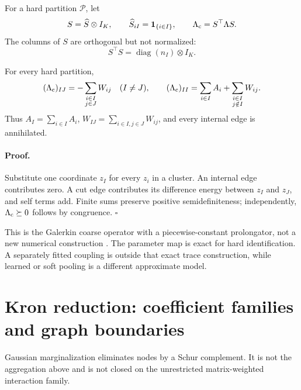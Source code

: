 For a hard partition \(\mathcal P\), let
\[
S=\widehat S\otimes I_K,\qquad
\widehat S_{iI}=\mathbf1_{\{i\in I\}},\qquad
\Lambda_{\rm c}=S^\top\Lambda S.
\]
The columns of \(S\) are orthogonal but not normalized:
\begin{equation}
S^\top S=\operatorname{diag}(n_I)\otimes I_K.
\label{eq:cg-aggregation-matrix}
\end{equation}

For every hard partition,
\begin{equation}
(\Lambda_{\rm c})_{IJ}
=-\sum_{\substack{i\in I\\j\in J}}W_{ij}\quad(I\neq J),
\qquad
(\Lambda_{\rm c})_{II}
=\sum_{i\in I}A_i
+\sum_{\substack{i\in I\\j\notin I}}W_{ij}.
\label{eq:cg-coarse-blocks}
\end{equation}
Thus \(A_I=\sum_{i\in I}A_i\),
\(W_{IJ}=\sum_{i\in I,j\in J}W_{ij}\), and every internal edge is
annihilated. 

\paragraph{Proof.}
Substitute one coordinate \(z_I\) for every \(z_i\) in a cluster. An internal
edge contributes zero. A cut edge contributes its difference energy between
\(z_I\) and \(z_J\), and self terms add. Finite sums preserve positive
semidefiniteness; independently,
\(\Lambda_{\rm c}\succeq0\) follows by congruence. \(\square\)

This is the Galerkin coarse operator with a piecewise-constant prolongator,
not a new numerical construction \citep{VanekMandelBrezina1996,Lee2024AMGSystems}.
The parameter map is exact for hard identification. A separately fitted
coupling is outside that exact trace construction, while learned or soft
pooling is a different approximate model. 

\section{Kron reduction: coefficient families and graph boundaries}
\label{sec:cg-kron}

Gaussian marginalization eliminates nodes by a Schur complement. It is not
the aggregation above and is not closed on the unrestricted matrix-weighted
interaction family.

